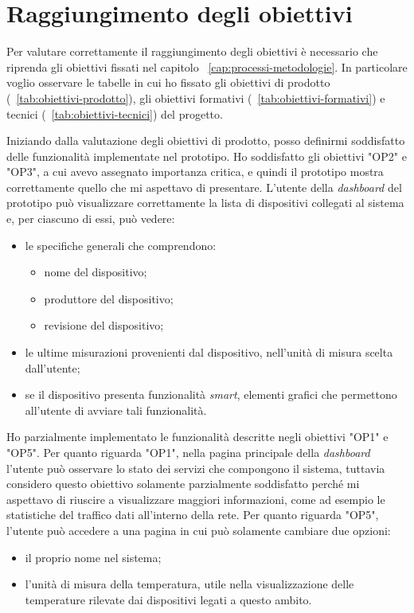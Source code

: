 \section{Raggiungimento degli obiettivi}

Per valutare correttamente il raggiungimento degli obiettivi è necessario che riprenda gli obiettivi fissati nel capitolo ~\ref{cap:processi-metodologie}.
In particolare voglio osservare le tabelle in cui ho fissato gli obiettivi di prodotto (~\ref{tab:obiettivi-prodotto}), gli obiettivi formativi (~\ref{tab:obiettivi-formativi}) e tecnici (~\ref{tab:obiettivi-tecnici}) del progetto.

Iniziando dalla valutazione degli obiettivi di prodotto, posso definirmi soddisfatto delle funzionalità implementate nel prototipo.
Ho soddisfatto gli obiettivi "OP2" e "OP3", a cui avevo assegnato importanza critica, e quindi il prototipo mostra correttamente quello che mi aspettavo di presentare.
L'utente della \emph{dashboard} del prototipo può visualizzare correttamente la lista di dispositivi collegati al sistema e, per ciascuno di essi, può vedere:
\begin{itemize}
  \item le specifiche generali che comprendono:
  \begin{itemize}
    \item nome del dispositivo;
    \item produttore del dispositivo;
    \item revisione del dispositivo;
  \end{itemize}
  \item le ultime misurazioni provenienti dal dispositivo, nell'unità di misura scelta dall'utente;
  \item se il dispositivo presenta funzionalità \emph{smart}, elementi grafici che permettono all'utente di avviare tali funzionalità.
\end{itemize}
Ho parzialmente implementato le funzionalità descritte negli obiettivi "OP1" e "OP5".
Per quanto riguarda "OP1", nella pagina principale della \emph{dashboard} l'utente può osservare lo stato dei servizi che compongono il sistema, tuttavia considero questo obiettivo solamente parzialmente soddisfatto perché mi aspettavo di riuscire a visualizzare maggiori informazioni, come ad esempio le statistiche del traffico dati all'interno della rete.
Per quanto riguarda "OP5", l'utente può accedere a una pagina in cui può solamente cambiare due opzioni:
\begin{itemize}
  \item il proprio nome nel sistema;
  \item l'unità di misura della temperatura, utile nella visualizzazione delle temperature rilevate dai dispositivi legati a questo ambito.
\end{itemize}
